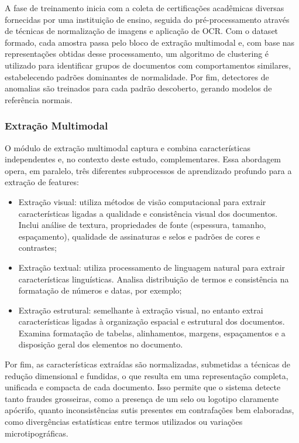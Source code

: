\documentclass[12pt]{article}
\begin{document}
A fase de treinamento inicia com a coleta de certificações acadêmicas diversas fornecidas por uma instituição de ensino, seguida do pré-processamento através de técnicas de normalização de imagens e aplicação de OCR. Com o dataset formado, cada amostra passa pelo bloco de extração multimodal e, com base nas representações obtidas desse processamento, um algoritmo de clustering é utilizado para identificar grupos de documentos com comportamentos similares, estabelecendo padrões dominantes de normalidade. Por fim, detectores de anomalias são treinados para cada padrão descoberto, gerando modelos de referência normais.

\subsubsection{Extração Multimodal}

O módulo de extração multimodal captura e combina características independentes e, no contexto deste estudo, complementares. Essa abordagem opera, em paralelo, três diferentes subprocessos de aprendizado profundo para a extração de features:

\begin{itemize}
  \item Extração visual: utiliza métodos de visão computacional para extrair características ligadas a qualidade e consistência visual dos documentos. Inclui análise de textura, propriedades de fonte (espessura, tamanho, espaçamento), qualidade de assinaturas e selos e padrões de cores e contrastes;
  \item Extração textual: utiliza processamento de linguagem natural para extrair características linguísticas. Analisa distribuição de termos e consistência na formatação de números e datas, por exemplo;
  \item Extração estrutural: semelhante à extração visual, no entanto extrai características ligadas à organização espacial e estrutural dos documentos. Examina formatação de tabelas, alinhamentos, margens, espaçamentos e a disposição geral dos elementos no documento.
\end{itemize}

Por fim, as características extraídas são normalizadas, submetidas a técnicas de redução dimensional e fundidas, o que resulta em uma representação completa, unificada e compacta de cada documento. Isso permite que o sistema detecte tanto fraudes grosseiras, como a presença de um selo ou logotipo claramente apócrifo, quanto inconsistências sutis presentes em contrafações bem elaboradas, como divergências estatísticas entre termos utilizados ou variações microtipográficas.
\end{document}
